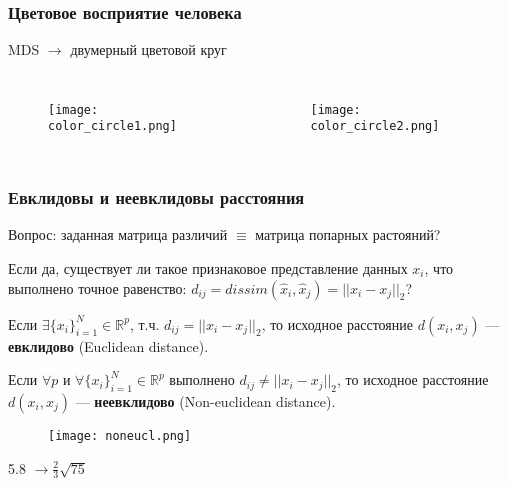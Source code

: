 \documentclass[10pt]{beamer}
\newcommand{\real}{\mathbb{R}}
\begin{document}
\begin{frame}
\frametitle{Цветовое восприятие человека}

MDS $\longrightarrow$ двумерный цветовой круг

\begin{columns}[c] %


\begin{figure}
\centering
        \texttt{[image: color\_circle1.png]}
\end{figure}


\begin{figure}
\centering
        \texttt{[image: color\_circle2.png]}
\end{figure}

\end{columns}

\end{frame}

\begin{frame}
\frametitle{Евклидовы и неевклидовы расстояния}

Вопрос: заданная матрица различий $\equiv$ матрица попарных растояний? 

Если да, существует ли такое признаковое представление данных $x_i$, что выполнено точное равенство: $d_{ij} = dissim(\widehat{x}_i, \widehat{x}_j) = ||x_i - x_j||_2$?

\vspace{\baselineskip}
Если $\exists \{x_i\}_{i=1}^{N} \in \real^p$, т.ч. $d_{ij} = ||x_i - x_j||_2$, то исходное расстояние $d(x_i, x_j)$ --- \textbf{евклидово} (Euclidean distance).

\vspace{\baselineskip}
Если $\forall p$ и $ \forall \{x_i\}_{i=1}^{N} \in \real^p$ выполнено $d_{ij} \neq ||x_i - x_j||_2$, то исходное расстояние $d(x_i, x_j)$ --- \textbf{неевклидово} (Non-euclidean distance).

\begin{figure}
\centering
        \texttt{[image: noneucl.png]}
\end{figure}

5.8 $\rightarrow \frac{2}{3} \sqrt{75}$
\end{frame}
\end{document}
